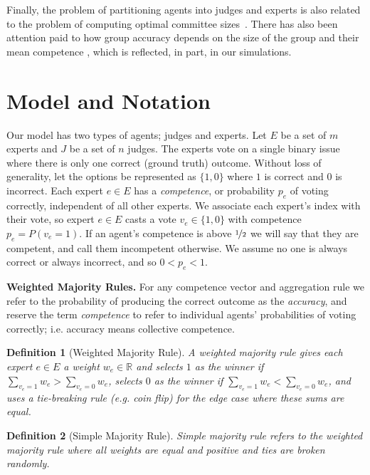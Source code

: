 \documentclass[letterpaper]{article} %
\newtheorem{definition}{Definition}
\newcommand{\judges}{\ensuremath{J} }
\newcommand{\experts}{\ensuremath{E} }
\newcommand{\expert}{\ensuremath{e} }
\newcommand{\vote}{\ensuremath{v} }
\begin{document}
Finally, the problem of partitioning agents into judges and experts is also related to the problem of computing optimal committee sizes~\cite{magdon2018mathematical,revel2021optimal}.
%
There has also been attention paid to how group accuracy depends on the size of the group and their mean competence \cite{grofman1978judgmental,grofman1984group}, which is reflected, in part, in our simulations.

\section{Model and Notation}
Our model has two types of agents; judges and experts.
Let \experts be a set of $m$ experts and \judges be a set of $n$ judges.
%
The experts vote on a single binary issue where there is only one correct (ground truth) outcome. Without loss of generality, let the options be represented as $\{1,0\}$ where $1$ is correct and $0$ is incorrect.
%
Each expert $\expert \in \experts$ has a \emph{competence}, or probability $p_\expert$ of voting correctly, independent of all other experts.
%
We associate each expert's index with their vote, so expert $\expert \in \experts$ casts a vote $\vote_\expert \in \{1,0\}$ with competence $p_\expert = P(\vote_\expert = 1)$.
%
If an agent's competence is above $\nicefrac{1}{2}$ we will say that they are competent, and call them incompetent otherwise.
%
We assume no one is always correct or always incorrect, and so $0 < p_\expert < 1$.
%


\noindent
\textbf{Weighted Majority Rules.\;}
For any competence vector and aggregation rule we refer to the probability of producing the correct outcome as the \emph{accuracy}, and reserve the term \emph{competence} to refer to individual agents' probabilities of voting correctly; i.e. accuracy means collective competence.

\begin{definition}[Weighted Majority Rule]
A weighted majority rule gives each expert $\expert \in \experts$ a weight $w_\expert \in \mathbb{R}$ and selects $1$ as the winner if $\sum\limits_{\vote_\expert = 1} w_\expert > \sum\limits_{\vote_\expert = 0} w_\expert$, selects $0$ as the winner if $\sum\limits_{\vote_\expert = 1} w_\expert < \sum\limits_{\vote_\expert = 0} w_\expert$, and uses a tie-breaking rule (e.g. coin flip) for the edge case where these sums are equal.
\end{definition}

\begin{definition}[Simple Majority Rule]
Simple majority rule refers to the weighted majority rule where all weights are equal and positive and ties are broken randomly.
\end{definition}
\end{document}
